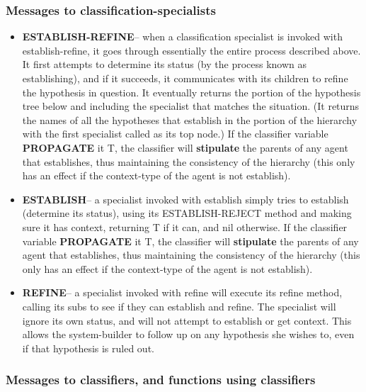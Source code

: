 \subsubsection{Messages to classification-specialists}

\begin{itemize}
\item {\bf ESTABLISH-REFINE}-- when a classification specialist is invoked
with establish-refine, it goes through essentially the entire process
described above. It first attempts to determine its status (by the
process known as establishing), and if it succeeds, it communicates
with its children to refine the hypothesis in question. It eventually
returns the portion of the hypothesis tree below and including the
specialist that matches the situation. (It returns the names of all
the hypotheses that establish in the portion of the hierarchy with the
first specialist called as its top node.)  If the classifier variable
{\bf PROPAGATE} it T, the classifier will {\bf stipulate} the parents
of any agent that establishes, thus maintaining the consistency of the
hierarchy (this only has an effect if the context-type of the agent is
not establish).


\item {\bf ESTABLISH}-- a specialist invoked with establish simply
tries to establish (determine its status), using its ESTABLISH-REJECT
method and making sure it has context, returning T if it can, and nil
otherwise. If the classifier variable {\bf PROPAGATE} it T, the
classifier will {\bf stipulate} the parents of any agent that
establishes, thus maintaining the consistency of the hierarchy (this
only has an effect if the context-type of the agent is not establish).

\item {\bf REFINE}-- a specialist invoked with refine will execute its
refine method, calling its subs to see if they can establish and
refine. The specialist will ignore its own status, and will not
attempt to establish or get context. This allows the system-builder to
follow up on any hypothesis she wishes to, even if that hypothesis is
ruled out. 
\end{itemize}

\subsubsection{Messages to classifiers, and functions using classifiers\label{get-context}}

